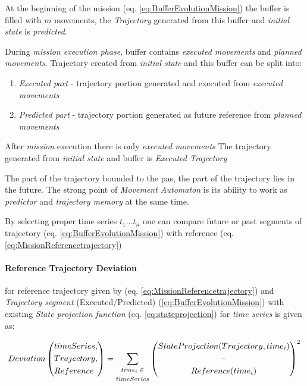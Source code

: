 At the beginning of the mission (eq. \ref{eq:BufferEvolutionMission}) the buffer is filled with $m$ movements, the \emph{Trajectory} generated from this buffer and \emph{initial state} is \emph{predicted}.

During \emph{mission execution phase}, buffer contains \emph{executed movements} and \emph{planned movements}. Trajectory created from \emph{initial state} and this buffer can be split into:

\begin{enumerate}
    \item\emph{Executed part} - trajectory portion generated and executed from \emph{executed movements}
    \item\emph{Predicted part} - trajectory portion generated as future reference from \emph{planned movements} 
\end{enumerate}

After \emph{mission} execution there is only \emph{executed movements} The trajectory generated from \emph{initial state} and buffer is \emph{Executed Trajectory}

\begin{note}
    The part of the trajectory bounded to the pas, the part of the trajectory lies in the future. The strong point of \emph{Movement Automaton} is its ability to work as \emph{predictor} and \emph{trajectory memory} at the same time.
    
    By selecting proper time series $t_1\dots t_n$ one can compare future or past segments of trajectory (eq. \ref{eq:BufferEvolutionMission}) with reference (eq. \ref{eq:MissionReferencetrajectory})
\end{note}

\paragraph{Reference Trajectory Deviation} for reference trajectory given by (eq. \ref{eq:MissionReferencetrajectory}) and \emph{Trajectory segment} (Executed/Predicted) (\ref{eq:BufferEvolutionMission}) with existing \emph{State projection function} (eq. \ref{eq:stateprojection}) for \emph{time series} is given as:

\begin{equation}\label{eq:ReferenceTrajectoryDeviation}
    Deviation\left(\begin{aligned}&timeSeries,\\ &Trajectory,\\ &Reference\end{aligned}\right) = \sum_{\scriptsize\begin{gathered}time_i \in\\ timeSeries\end{gathered}\normalsize} \left(\begin{gathered}StateProjection(Trajectory,time_i)\\-\\Reference(time_i)\end{gathered}\right)^2
\end{equation}

